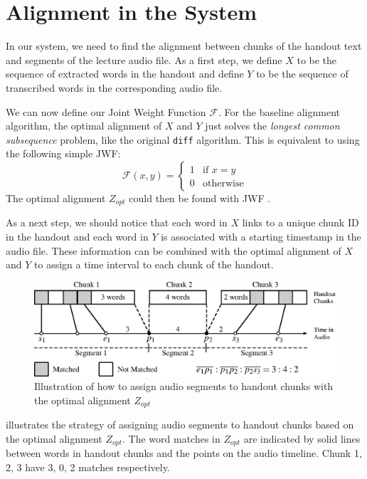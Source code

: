 \section{Alignment in the System}
\label{sec:align-in-system}

In our system, we need to find the alignment between chunks of the handout text and segments of the lecture audio file. As a first step, we define $X$ to be the sequence of extracted words in the handout and define $Y$ to be the sequence of transcribed words in the corresponding audio file.

We can now define our Joint Weight Function $\mathcal{F}$. For the baseline alignment algorithm, the optimal alignment of $X$ and $Y$ just solves the \textit{longest common subsequence} problem, like the original \texttt{diff} algorithm. This is equivalent to using the following simple JWF:
\begin{equation}
  \mathcal{F}(x,y) = 
  \begin{cases}
    1 & \text{if } x = y\\
    0 & \text{otherwise}
  \end{cases}
  \label{eq:jwf-baseline}
\end{equation}
The optimal alignment $Z_{opt}$ could then be found with JWF .

As a next step, we should notice that each word in $X$ links to a unique chunk ID in the handout and each word in $Y$ is associated with a starting timestamp in the audio file. These information can be combined with the optimal alignment of $X$ and $Y$ to assign a time interval to each chunk of the handout.

\begin{figure}[!tb]
  \centering
  \includegraphics[width=.9\textwidth]{align-algo-fig.eps}
  \caption{Illustration of how to assign audio segments to handout chunks with the optimal alignment $Z_{opt}$}
  \label{fig:align-algo-fig}
\end{figure}

 illustrates the strategy of assigning audio segments to handout chunks based on the optimal alignment $Z_{opt}$. The word matches in $Z_{opt}$ are indicated by solid lines between words in handout chunks and the points on the audio timeline. Chunk 1, 2, 3 have 3, 0, 2 matches respectively.


